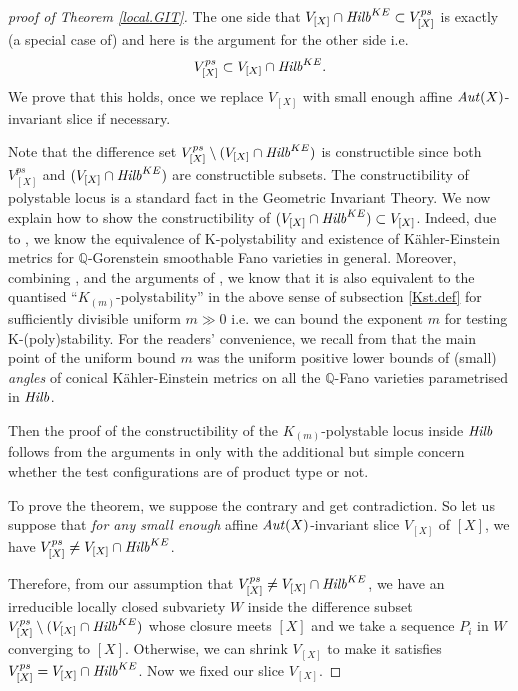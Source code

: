 \documentclass[12pt]{amsart}
\theoremstyle{remark}
\theoremstyle{definition}
\begin{document}
\begin{proof}[proof of Theorem \ref{local.GIT}]

The one side that
$V_{[X]}\cap {\it Hilb}^{KE}\subset V_{[X]}^{ps}$ 
is exactly (a special case of) \cite[Lemma 3.6]{OSS} and here is the argument for 
the 
other side i.e. $$V_{[X]}^{ps}\subset V_{[X]}\cap {\it Hilb}^{KE}.$$ 
We prove that this holds, once we replace $V_{[X]}$ with small enough affine 
${\it Aut}(X)$-invariant slice if necessary. 

Note that the difference set $V_{[X]}^{ps}\setminus (V_{[X]}\cap {\it Hilb}^{KE})$ 
is constructible since both 
$V_{[X]}^{ps}$ and $(V_{[X]}\cap {\it Hilb}^{KE})$ are constructible subsets. 
The constructibility of polystable locus is a 
standard fact in the Geometric Invariant 
Theory. 
We now explain how to show the constructibility of 
$(V_{[X]}\cap {\it Hilb}^{KE})\subset V_{[X]}$. 
Indeed, due to \cite[Theorem 1]{SSY}, we know the equivalence of K-polystability and 
existence of K\"ahler-Einstein metrics for $\mathbb{Q}$-Gorenstein 
smoothable Fano varieties in general. Moreover, combining 
\cite[esp. II Theorem1, III Theorem 2]{CDS}, \cite[4.2.2]{SSY} and 
the arguments of \cite[esp. (2.4-8)]{Od2}, 
we know that it is also equivalent to the quantised ``$K_{(m)}$-polystability'' 
in the above sense of subsection \ref{Kst.def} for sufficiently divisible uniform $m\gg 0$ i.e. 
we can bound the exponent $m$ for testing K-(poly)stability. 
For the readers' convenience, we recall from \cite[esp. (2.4-8)]{Od2} 
that the main point of the 
uniform bound $m$ was the uniform positive lower bounds of (small) 
\textit{angles} of conical K\"ahler-Einstein metrics on all the $\mathbb{Q}$-Fano 
varieties parametrised in ${\it Hilb}$. 

Then the proof of 
the constructibility of the $K_{(m)}$-polystable locus inside ${\it Hilb}$ 
follows from the arguments in \cite[esp. (2.10-12)]{Od2} 
only with the additional but simple concern 
whether the test configurations are of product type or not. 

To prove the theorem, we suppose the contrary and get contradiction. 
So let us suppose that \textit{for any small enough} 
affine ${\it Aut}(X)$-invariant slice 
$V_{[X]}$ of $[X]$, we have $V_{[X]}^{ps}\neq V_{[X]}\cap {\it Hilb}^{KE}$. 

Therefore, from our assumption that
$V_{[X]}^{ps}\neq V_{[X]}\cap {\it Hilb}^{KE}$, 
we have an irreducible locally closed subvariety $W$ inside 
the difference subset $V_{[X]}^{ps}\setminus (V_{[X]}\cap {\it Hilb}^{KE})$ 
whose closure meets $[X]$ and we take a sequence $P_{i}$ in $W$ converging to 
$[X]$. Otherwise, we can shrink $V_{[X]}$ to make it satisfies 
$V_{[X]}^{ps}= V_{[X]}\cap {\it Hilb}^{KE}$. 
Now we fixed our slice $V_{[X]}$. 


\end{proof}
\end{document}
